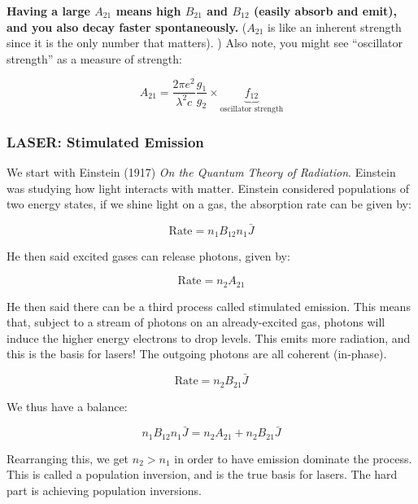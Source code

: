 \documentclass{article}
\begin{document}
\textbf{Having a large $A_{21}$ means high $B_{21}$ and $B_{12}$ (easily absorb and emit), and you also decay faster spontaneously. } ($A_{21}$ is like an inherent strength since it is the only number that matters). ) Also note, you might see ``oscillator strength'' as a measure of strength:

\begin{equation}
    A_{21} = \frac{2 \pi e^2 }{\lambda^2 c} \frac{g_1}{g_2} \times \underbrace{f_{12}}_{\text{oscillator strength}}
\end{equation}

\subsubsection{LASER: Stimulated Emission}

We start with Einstein (1917) \textit{On the Quantum Theory of Radiation}. Einstein was studying how light interacts with matter. Einstein considered populations of two energy states, if we shine light on a gas, the absorption rate can be given by:

\begin{equation}
    \text{Rate} = n_1 B_{12} n_1 \bar{J}
\end{equation}

He then said excited gases can release photons, given by:

\begin{equation}
    \text{Rate} = n_2 A_{21}
\end{equation}

He then said there can be a third process called stimulated emission. This means that, subject to a stream of photons on an already-excited gas, photons will induce the higher energy electrons to drop levels. This emits more radiation, and this is the basis for lasers! The outgoing photons are all coherent (in-phase). 

\begin{equation}
    \text{Rate} = n_2 B_{21} \bar{J}
\end{equation}

We thus have a balance:

\begin{equation}
    n_1 B_{12} n_1 \bar{J} = n_2 A_{21} +  n_2 B_{21} \bar{J}
\end{equation}

Rearranging this, we get $n_2>n_1$ in order to have emission dominate the process. This is called a population inversion, and is the true basis for lasers. The hard part is achieving population inversions. 
\end{document}
